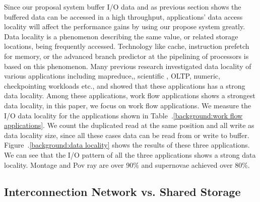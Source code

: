 Since our proposal
system buffer I/O data and as previous section shows the buffered data can be accessed in a high
throughput, applications' data access locality will affect the performance gains by using our
propose system greatly.
Data locality is a phenomenon describing the same value, or related storage locations, being
frequently accessed.
Technology like cache, instruction prefetch for memory, or the advanced branch predictor
at the pipelining of processors is based on this phenomenon.
Many previous research investigated data locality of various
applications including 
mapreduce,\cite{Investigation_of_Data_Locality_in_MapReduce}, scientific
\cite{Intrinsic_data_locality_of_modern_scientific_workloads},
OLTP\cite{Data_locality_characterization_of_OLTP},
numeric\cite{Analyzing_data_locality_in_numeric_applications}, checkpointing\cite{checkpointing}
workloads etc., and showed that these applications has a strong data locality.
Among these applications, work flow applications shows a strongest data locality, in this paper, we
focus on work flow applications.
We measure the I/O data locality for the applications shown in
Table~.\ref{background:work flow applications}.
We count the duplicated read at the same position and all write as data locality size, since all
these cases data can be read from or write to buffer.
Figure~.\ref{background:data locality} shows the results of these three applications.
We can see
that the I/O pattern of all the three applications shows a strong data locality. Montage and Pov ray
are over 90\% and supernovae achieved over 80\%.


\subsection{Interconnection Network vs. Shared Storage}

